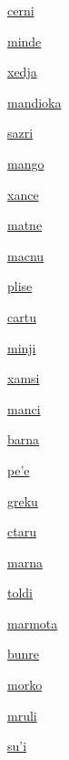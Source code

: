 {\hyperlink{val:cerni}{cerni}}{}{}{}

{\hyperlink{val:minde}{minde}}{}{}{}

{\hyperlink{val:xedja}{xedja}}{}{}{}

{\hyperlink{val:mandioka}{mandioka}}{}{}{}

{\hyperlink{val:sazri}{sazri}}{}{}{}

{\hyperlink{val:mango}{mango}}{}{}{}

{\hyperlink{val:xance}{xance}}{}{}{}

{\hyperlink{val:matne}{matne}}{}{}{}

{\hyperlink{val:macnu}{macnu}}{}{}{}

{\hyperlink{val:plise}{plise}}{}{}{}

{\hyperlink{val:cartu}{cartu}}{}{}{}

{\hyperlink{val:minji}{minji}}{}{}{}

{\hyperlink{val:xamsi}{xamsi}}{}{}{}

{\hyperlink{val:manci}{manci}}{}{}{}

{\hyperlink{val:barna}{barna}}{}{}{}

{\hyperlink{val:pehe}{pe'e}}{}{}{}

{\hyperlink{val:greku}{greku}}{}{}{}

{\hyperlink{val:ctaru}{ctaru}}{}{}{}

{\hyperlink{val:marna}{marna}}{}{}{}

{\hyperlink{val:toldi}{toldi}}{}{}{}

{\hyperlink{val:marmota}{marmota}}{}{}{}

{\hyperlink{val:bunre}{bunre}}{}{}{}

{\hyperlink{val:morko}{morko}}{}{}{}

{\hyperlink{val:mruli}{mruli}}{}{}{}

{\hyperlink{val:suhi}{su'i}}{}{}{}

